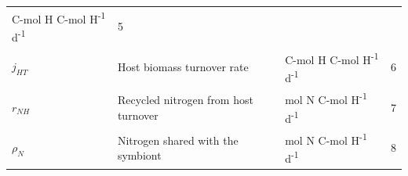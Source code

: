 \documentclass[]{elsarticle} %
\begin{document}
\begin{longtable}[c]{@{}llll@{}}
\begin{minipage}[t]{0.27\columnwidth}\raggedright\strut
C-mol H C-mol H\textsuperscript{-1} d\textsuperscript{-1}
\strut\end{minipage} &
\begin{minipage}[t]{0.10\columnwidth}\raggedright\strut
5
\strut\end{minipage}\tabularnewline
\begin{minipage}[t]{0.10\columnwidth}\raggedright\strut
\(j_{HT}\)
\strut\end{minipage} &
\begin{minipage}[t]{0.45\columnwidth}\raggedright\strut
Host biomass turnover rate
\strut\end{minipage} &
\begin{minipage}[t]{0.27\columnwidth}\raggedright\strut
C-mol H C-mol H\textsuperscript{-1} d\textsuperscript{-1}
\strut\end{minipage} &
\begin{minipage}[t]{0.10\columnwidth}\raggedright\strut
6
\strut\end{minipage}\tabularnewline
\begin{minipage}[t]{0.10\columnwidth}\raggedright\strut
\(r_{NH}\)
\strut\end{minipage} &
\begin{minipage}[t]{0.45\columnwidth}\raggedright\strut
Recycled nitrogen from host turnover
\strut\end{minipage} &
\begin{minipage}[t]{0.27\columnwidth}\raggedright\strut
mol N C-mol H\textsuperscript{-1} d\textsuperscript{-1}
\strut\end{minipage} &
\begin{minipage}[t]{0.10\columnwidth}\raggedright\strut
7
\strut\end{minipage}\tabularnewline
\begin{minipage}[t]{0.10\columnwidth}\raggedright\strut
\(\rho_N\)
\strut\end{minipage} &
\begin{minipage}[t]{0.45\columnwidth}\raggedright\strut
Nitrogen shared with the symbiont
\strut\end{minipage} &
\begin{minipage}[t]{0.27\columnwidth}\raggedright\strut
mol N C-mol H\textsuperscript{-1} d\textsuperscript{-1}
\strut\end{minipage} &
\begin{minipage}[t]{0.10\columnwidth}\raggedright\strut
8
\strut\end{minipage}\tabularnewline

\end{longtable}
\end{document}
